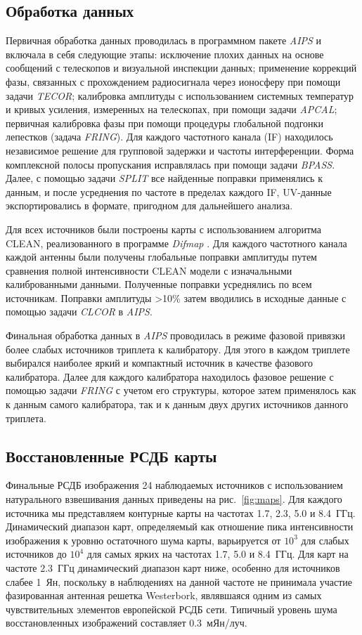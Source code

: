\subsection{Обработка данных}
Первичная обработка данных проводилась в программном пакете \emph{AIPS} \cite{Greisen_2003} и
включала в себя следующие этапы: исключение плохих данных на основе сообщений с телескопов и
визуальной инспекции данных; применение коррекций фазы, связанных с прохождением радиосигнала через
ионосферу при помощи задачи \emph{TECOR}; калибровка амплитуды с использованием системных
температур и кривых усиления, измеренных на телескопах, при помощи задачи \emph{APCAL}; первичная
калибровка фазы при помощи процедуры глобальной подгонки лепестков (задача \emph{FRING}). Для
каждого частотного канала (IF) находилось независимое решение для групповой задержки и частоты
интерференции. Форма комплексной полосы пропускания исправлялась при помощи задачи
\emph{BPASS}. Далее, с помощью задачи \emph{SPLIT} все найденные поправки применялись к данным, и
после усреднения по частоте в пределах каждого IF, UV-данные экспортировались в формате, пригодном
для дальнейшего анализа.

Для всех источников были построены карты с использованием алгоритма CLEAN, реализованного в
программе {\em Difmap} \cite{Shepherd_1997}. Для каждого частотного канала каждой антенны
были получены глобальные поправки амплитуды путем сравнения полной интенсивности CLEAN модели с
изначальными калиброванными данными. Полученные поправки усреднялись по всем источникам.
Поправки амплитуды >10\% затем вводились в исходные данные с помощью задачи \emph{CLCOR} в
\emph{AIPS}.

Финальная обработка данных в \emph{AIPS} проводилась в режиме фазовой привязки более слабых
источников триплета к калибратору. Для этого в каждом триплете выбирался наиболее яркий и
компактный источник в качестве фазового калибратора. Далее для каждого калибратора находилось
фазовое решение с помощью задачи \emph{FRING} с учетом его структуры, которое затем применялось как
к данным самого калибратора, так и к данным двух других источников данного триплета.

\subsection{Восстановленные РСДБ карты}

Финальные РСДБ изображения 24 наблюдаемых источников с использованием натурального взвешивания
данных приведены на рис.~\ref{fig:maps}. Для каждого источника мы представляем контурные карты на
частотах 1.7, 2.3, 5.0 и 8.4~ГГц. Динамический диапазон карт, определяемый как отношение пика
интенсивности изображения к уровню остаточного шума карты, варьируется от $10^3$ для слабых
источников до $10^4$ для самых ярких на частотах 1.7, 5.0 и 8.4~ГГц. Для карт
на частоте 2.3~ГГц динамический диапазон карт ниже, особенно для источников слабее 1~Ян, поскольку в
наблюдениях на данной частоте не принимала участие фазированная антенная решетка Westerbork,
являвшаяся одним из самых чувствительных элементов европейской РСДБ сети. Типичный уровень шума
восстановленных изображений составляет 0.3~мЯн/луч.

